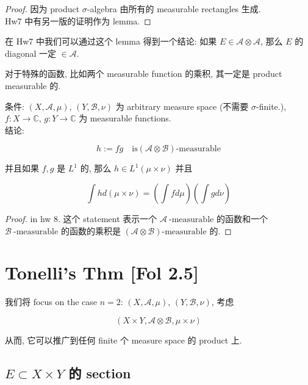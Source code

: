 \begin{proof}

因为 product \(\sigma\)-algebra 由所有的 measurable rectangles 生成.\\
Hw7 中有另一版的证明作为 lemma.

\end{proof}

在 Hw7 中我们可以通过这个 lemma 得到一个结论: 如果 \(E \in \mathcal{A} \otimes \mathcal{A}\), 那么 \(E\) 的 diagonal 一定 \(\in \mathcal{A}\).

对于特殊的函数, 比如两个 measurable function 的乘积, 其一定是 product measurable 的.

\begin{lemma}{}

条件: \((X,\mathcal{A},\mu)\), \((Y,\mathcal{B},\nu)\) 为 arbitrary measure space (不需要 \(\sigma\)-finite.), \(f:X\rightarrow\mathbb{C}\), \(g:Y\rightarrow\mathbb{C}\) 为 measurable functions.\\
结论:

\[h := fg\quad\text{is}(\mathcal{A} \otimes \mathcal{B})\text{-measurable}\]

并且如果 \(f,g\) 是 \(L^{1}\) 的, 那么 \(h \in L^{1}(\mu \times \nu)\) 并且

\[\int h d(\mu \times \nu) = (\int f d\mu)(\int g d\nu)\]

\end{lemma}

\begin{proof}

in hw 8. 这个 statement 表示一个 \(\mathcal{A}\ \text{-measurable}\) 的函数和一个 \(\mathcal{B}\ \text{-measurable}\) 的函数的乘积是 \((\mathcal{A} \otimes \mathcal{B})\text{-measurable}\) 的.

\end{proof}

\section{Tonelli's Thm {[}Fol 2.5{]}}

我们将 focus on the case \(n = 2\): \((X,\mathcal{A},\mu)\), \((Y,\mathcal{B},\nu)\), 考虑

\[(X \times Y,\mathcal{A} \otimes \mathcal{B},\mu \times \nu)\]

从而, 它可以推广到任何 finite 个 measure space 的 product 上.

\subsection{\texorpdfstring{\(E \subset X \times Y\) 的 section}{E \textbackslash subset X \textbackslash times Y 的 section}}

